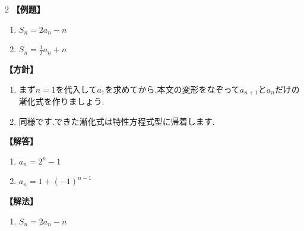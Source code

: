 \documentclass[dvipdfmx,a4paper,11pt,fleqn,openany]{jsbook}
\begin{document}
\begin{multicols*}{2}
      \noindent \textbf{【例題】}
      \begin{enumerate}[label=(\arabic*),parsep=3pt]
        \item $\displaystyle S_n=2a_n-n$
        \item $\displaystyle S_n=\frac12a_n+n$
      \end{enumerate}

      \noindent\textbf{【方針】}
      \begin{enumerate}[label=(\arabic*),parsep=3pt]
        \item まず$n=1$を代入して$a_1$を求めてから,本文の変形をなぞって$a_{n+1}$と$a_n$だけの漸化式を作りましょう.
        \item 同様です.できた漸化式は特性方程式型に帰着します.
      \end{enumerate}

      \noindent\textbf{【解答】}
      \begin{enumerate}[label=(\arabic*),parsep=3pt]
        \item $\displaystyle a_n=2^n-1$
        \item $\displaystyle a_n=1+(-1)^{n-1}$
      \end{enumerate}

      \noindent\textbf{【解法】}
      \begin{enumerate}[label=(\arabic*),parsep=3pt]
      \item $\displaystyle S_n=2a_n-n$


\end{enumerate}
\end{multicols*}
\end{document}
